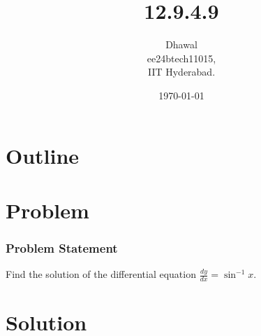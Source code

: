 \documentclass{beamer}
\title{12.9.4.9}
\author{Dhawal \\ ee24btech11015,\\IIT Hyderabad.}
\date{\today}
\theoremstyle{remark}
\numberwithin{equation}{section}
\begin{document}
\begin{frame}
\titlepage
\end{frame}

\section*{Outline}
\begin{frame}
\tableofcontents
\end{frame}
\section{Problem}
\begin{frame}
\frametitle{Problem Statement}
%
 Find the solution of the differential equation $\frac{dy}{dx}=\sin^{-1}{x}$.

\end{frame}

\section{Solution}
\end{document}
